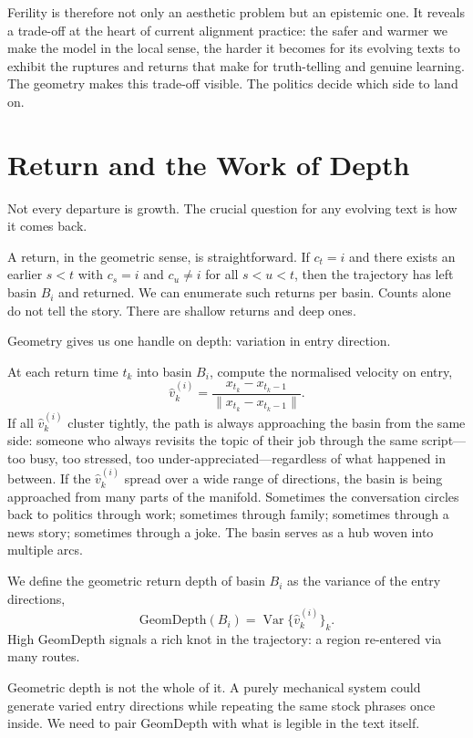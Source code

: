 \documentclass[12pt,a4paper]{article}
\begin{document}
Ferility is therefore not only an aesthetic problem but an epistemic one. It reveals a trade-off at the heart of current alignment practice: the safer and warmer we make the model in the local sense, the harder it becomes for its evolving texts to exhibit the ruptures and returns that make for truth-telling and genuine learning. The geometry makes this trade-off visible. The politics decide which side to land on.

\section{Return and the Work of Depth}

Not every departure is growth. The crucial question for any evolving text is how it comes back.

A return, in the geometric sense, is straightforward. If $c_t = i$ and there exists an earlier $s < t$ with $c_s = i$ and $c_u \neq i$ for all $s < u < t$, then the trajectory has left basin $B_i$ and returned. We can enumerate such returns per basin. Counts alone do not tell the story. There are shallow returns and deep ones.

Geometry gives us one handle on depth: variation in entry direction.

At each return time $t_k$ into basin $B_i$, compute the normalised velocity on entry,
\[
\hat{v}^{(i)}_{k} = \frac{x_{t_k} - x_{t_k-1}}{\|x_{t_k} - x_{t_k-1}\|}.
\]
If all $\hat{v}^{(i)}_{k}$ cluster tightly, the path is always approaching the basin from the same side: someone who always revisits the topic of their job through the same script---too busy, too stressed, too under-appreciated---regardless of what happened in between. If the $\hat{v}^{(i)}_{k}$ spread over a wide range of directions, the basin is being approached from many parts of the manifold. Sometimes the conversation circles back to politics through work; sometimes through family; sometimes through a news story; sometimes through a joke. The basin serves as a hub woven into multiple arcs.

We define the geometric return depth of basin $B_i$ as the variance of the entry directions,
\[
\text{GeomDepth}(B_i) = \operatorname{Var}\bigl\{\hat{v}^{(i)}_{k}\bigr\}_k.
\]
High GeomDepth signals a rich knot in the trajectory: a region re-entered via many routes.

Geometric depth is not the whole of it. A purely mechanical system could generate varied entry directions while repeating the same stock phrases once inside. We need to pair GeomDepth with what is legible in the text itself.
\end{document}

